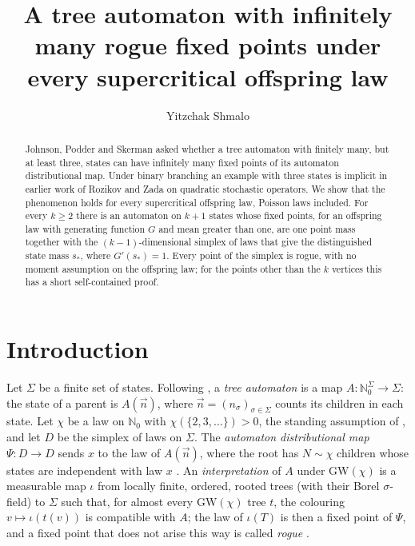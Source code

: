 \documentclass[11pt]{amsart}
\newcommand{\AUTHORNAME}{Yitzchak Shmalo}
\newcommand{\AFFILIATION}{Einstein Institute of Mathematics, The Hebrew University of Jerusalem, Jerusalem, Israel}
\newcommand{\AUTHOREMAIL}{}
\theoremstyle{remark}
\newcommand{\N}{\mathbb{N}}
\newcommand{\GW}{\mathrm{GW}}
\begin{document}
\title[Tree automata with a simplex of fixed points]{A tree automaton with infinitely many rogue fixed points under every supercritical offspring law}

\author{\AUTHORNAME}
\address{\AFFILIATION}
\email{\AUTHOREMAIL}


\begin{abstract}
Johnson, Podder and Skerman asked whether a tree automaton with finitely many, but at least three, states can have infinitely many fixed points of its automaton distributional map. Under binary branching an example with three states is implicit in earlier work of Rozikov and Zada on quadratic stochastic operators. We show that the phenomenon holds for every supercritical offspring law, Poisson laws included. For every $k\ge2$ there is an automaton on $k+1$ states whose fixed points, for an offspring law with generating function $G$ and mean greater than one, are one point mass together with the $(k-1)$-dimensional simplex of laws that give the distinguished state mass $s_*$, where $G'(s_*)=1$. Every point of the simplex is rogue, with no moment assumption on the offspring law; for the points other than the $k$ vertices this has a short self-contained proof.
\end{abstract}

\maketitle

\section{Introduction}

Let $\Sigma$ be a finite set of states. Following \cite{JPS}, a \emph{tree automaton} is a map $A\colon \N_0^\Sigma\to\Sigma$: the state of a parent is $A(\vec n)$, where $\vec n=(n_\sigma)_{\sigma\in\Sigma}$ counts its children in each state. Let $\chi$ be a law on $\N_0$ with $\chi(\{2,3,\dots\})>0$, the standing assumption of \cite[Section~1.2]{JPS}, and let $D$ be the simplex of laws on $\Sigma$. The \emph{automaton distributional map} $\Psi\colon D\to D$ sends $x$ to the law of $A(\vec n)$, where the root has $N\sim\chi$ children whose states are independent with law $x$ \cite[Section~1.5]{JPS}. An \emph{interpretation} of $A$ under $\GW(\chi)$ is a measurable map $\iota$ from locally finite, ordered, rooted trees (with their Borel $\sigma$-field) to $\Sigma$ such that, for almost every $\GW(\chi)$ tree $t$, the colouring $v\mapsto\iota(t(v))$ is compatible with $A$; the law of $\iota(T)$ is then a fixed point of $\Psi$, and a fixed point that does not arise this way is called \emph{rogue} \cite[Sections~1.4 and~1.5]{JPS}.
\end{document}
